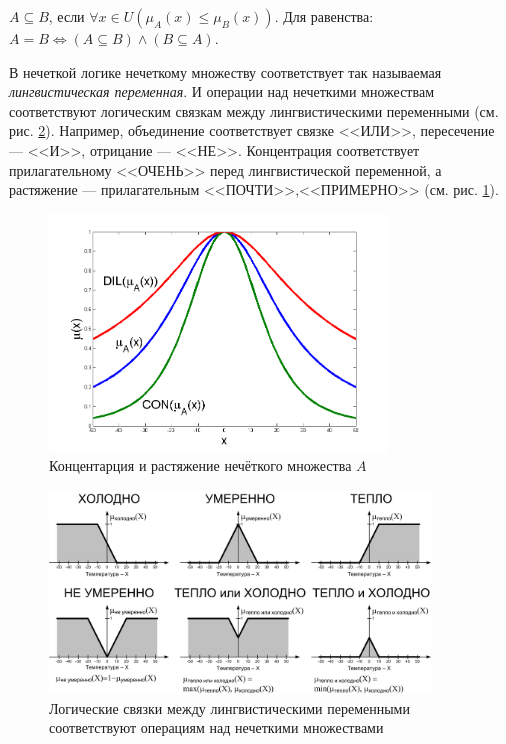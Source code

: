 $A\subseteq B$, если $\forall x\in U (\mu_A(x)\leq\mu_B(x))$. Для равенства: $A=B\Leftrightarrow (A\subseteq B)\land(B\subseteq A)$.

В нечеткой логике нечеткому множеству соответствует так называемая \emph{лингвистическая переменная}. И операции над нечеткими множествам соответствуют логическим связкам между лингвистическими переменными (см. рис. \ref{fig:fuz:fuzzyOperations}). Например, объединение соответствует связке <<ИЛИ>>, пересечение --- <<И>>, отрицание --- <<НЕ>>. Концентрация соответствует прилагательному <<ОЧЕНЬ>> перед лингвистической переменной, а растяжение --- прилагательным <<ПОЧТИ>>,<<ПРИМЕРНО>> (см. рис. \ref{fig:fuz:fuzzyConDil}).

\begin{figure}
    \centering
    \includegraphics[width=0.8\textwidth]{fig/fuzzyConDil}
    \caption{Концентарция и растяжение нечёткого множества $A$}
    \label{fig:fuz:fuzzyConDil}
\end{figure} 


\begin{figure}
    \centering
    \includegraphics[width=0.9\textwidth]{fig/fuzzyOperations}
    \caption{Логические связки между лингвистическими переменными соответствуют операциям над нечеткими множествами}
    \label{fig:fuz:fuzzyOperations}
\end{figure} 

